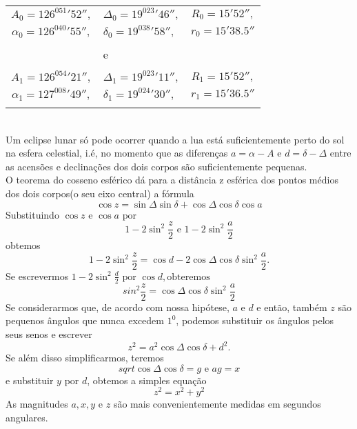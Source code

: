 \begin{tabular}{clr}
	
	$A_0 = 126^051' 52'',$&$\Delta_0=19^023'46'',$&$R_0=15'52'',$ \\
	$\alpha_0=126^040'55'',$&$\delta_0=19^038'58'',$&$r_0=15'38.5''$ \\
	\\
	& \textrm{e}\\
	\\
	$A_1 = 126^054' 21'',$&$\Delta_1=19^023'11'',$&$R_1=15'52'',$ \\
	$\alpha_1=127^008'49'',$&$\delta_1=19^024'30'',$&$r_1=15'36.5''$ \\\\
	
\end{tabular}
 \\
Um eclipse lunar só pode ocorrer quando a lua está suficientemente perto do sol na esfera celestial, i.é, no momento que as diferenças $a = \alpha-A$ e $d = \delta - \Delta$ entre as acensões e declinações dos dois corpos são suficientemente pequenas.\\
O teorema do cosseno esférico dá para a distância z esférica dos pontos médios dos dois corpos(o seu eixo central) a fórmula
$$\cos z = \sin\Delta\sin\delta+\cos\Delta\cos\delta\cos a$$ 
Substituindo $\cos z \textrm{ e } \cos a \textrm{ por }$
$$1 - 2\sin^2\frac{z}{2} \textrm{ e } 1 - 2\sin^2\frac{a}{2}$$
obtemos
$$1 - 2\sin^2\frac{z}{2}=\cos d -2\cos\Delta\cos\delta\sin^2\frac{a}{2}.$$
Se escrevermos $1 - 2\sin^2\frac{d}{2} \textrm{ por } \cos d, \textrm{obteremos}$
$$sin^2\frac{z}{2} = \cos \Delta\cos\delta\sin^2\frac{a}{2}$$
Se considerarmos que, de acordo com nossa hipótese, $ a$ e $d$ e então, também $z$ são pequenos ângulos que nunca excedem $1^0$, podemos substituir os ângulos pelos seus senos e escrever
$$z^2=a^2\cos\Delta\cos\delta+d^2.$$
Se além disso simplificarmos, teremos
$$sqrt{\cos\Delta\cos\delta}=g \textrm{ e }ag=x$$
e substituir $y$ por $d$, obtemos a simples equação
$$z^2=x^2+y^2$$
As magnitudes $a,x,y \textrm{ e }z$ são mais convenientemente medidas em segundos angulares.

